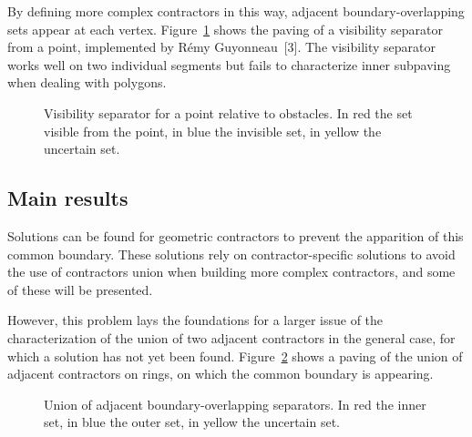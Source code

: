 \documentclass[14pt, a4paper]{article}
\begin{document}
		By defining more complex contractors in this way, adjacent boundary-overlapping sets appear at each vertex. Figure~\ref{fig:sepvisible} shows the paving of a visibility separator from a point, implemented by Rémy Guyonneau~[3]. The visibility separator works well on two individual segments but fails to characterize inner subpaving when dealing with polygons.

		\begin{figure}[!htb]
			\centering
			\begin{subfigure}[t]{.31\textwidth}
				
			\end{subfigure}%
			\hfill
			\begin{subfigure}[t]{.31\textwidth}
				
			\end{subfigure}%
			\hfill
			\begin{subfigure}[t]{.31\textwidth}
				
			\end{subfigure}
			\caption{Visibility separator for a point relative to obstacles. In red the set visible from the point, in blue the invisible set, in yellow the uncertain set.}
			\label{fig:sepvisible}
		\end{figure}

	\subsection*{Main results}
		Solutions can be found for geometric contractors to prevent the apparition of this common boundary. These solutions rely on contractor-specific solutions to avoid the use of contractors union when building more complex contractors, and some of these will be presented.
		
		However, this problem lays the foundations for a larger issue of the characterization of the union of two adjacent contractors in the general case, for which a solution has not yet been found. Figure~\ref{fig:general_case} shows a paving of the union of adjacent contractors on rings, on which the common boundary is appearing.

		\begin{figure}[!htb]
			\centering
			\begin{subfigure}[t]{.48\textwidth}
				
			\end{subfigure}%
			\hfill
			\begin{subfigure}[t]{.48\textwidth}
				
			\end{subfigure}
			\caption{Union of adjacent boundary-overlapping separators. In red the inner set, in blue the outer set, in yellow the uncertain set.}
			\label{fig:general_case}
		\end{figure}
\end{document}
